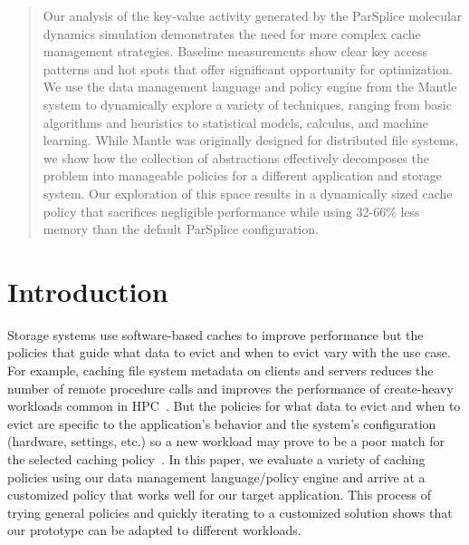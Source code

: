 \begin{abstract}

Our analysis of the key-value activity generated by the ParSplice molecular
dynamics simulation demonstrates the need for more complex cache management
strategies. Baseline measurements show clear key access patterns and hot spots
that offer significant opportunity for optimization. We use the data management
language and policy engine from the Mantle system to dynamically explore a
variety of techniques, ranging from basic algorithms and heuristics to
statistical models, calculus, and machine learning. While Mantle was originally
designed for distributed file systems, we show how the collection of
abstractions effectively decomposes the problem into manageable policies for a
different application and storage system.  Our exploration of this space results in a
dynamically sized cache policy that sacrifices negligible performance while
using 32-66\% less memory than the default ParSplice configuration.

\end{abstract}

\section{Introduction}

Storage systems use software-based caches to improve performance but the
policies that guide what data to evict and when to evict vary with the use
case. For example, caching file system metadata on clients and servers reduces
the number of remote procedure calls and improves the performance of
create-heavy workloads common in HPC~\cite{ren:sc2014-indexfs,
patil:fast2011-giga+}. But the policies for what data to evict and when to
evict are specific to the application's behavior and the system's configuration
(hardware, settings, etc.) so a new workload may prove to be a poor match for
the selected caching
policy~\cite{xiao:socc15-shardfs,brandt:msst2003-lh,sevilla:sc15-mantle,
weil:sc2004-dyn-metadata, weil:osdi2006-ceph}. In this paper, we evaluate a
variety of caching policies using our data management language/policy engine and
arrive at a customized policy that works well for our target application.  This
process of trying general policies and quickly iterating to a customized
solution shows that our prototype can be adapted to different workloads.

